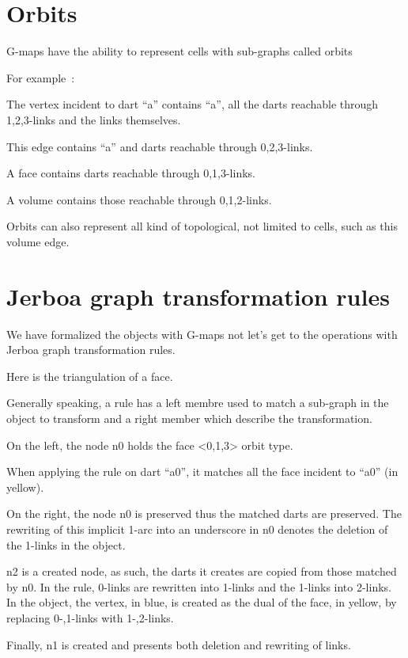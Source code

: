 \documentclass[11pt]{article}
\begin{document}
\section{Orbits}
\label{sec:org99b57a4}

G-maps have the ability to represent cells with sub-graphs called orbits

For example~:

The vertex incident to dart ``a'' contains ``a'', all the darts reachable
through 1,2,3-links and the links themselves.

This edge contains ``a'' and darts reachable through 0,2,3-links.

A face contains darts reachable through 0,1,3-links.

A volume contains those reachable through 0,1,2-links.

Orbits can also represent all kind of topological, not limited to cells, such as
this volume edge.

\section{Jerboa graph transformation rules}
\label{sec:org89fe9a5}

We have formalized the objects with G-maps not let's get to the operations with
Jerboa graph transformation rules.

Here is the triangulation of a face.

Generally speaking, a rule has a left membre used to match a sub-graph in the
object to transform and a right member which describe the transformation.

On the left, the node n0 holds the face <0,1,3> orbit type.

When applying the rule on dart ``a0'', it matches all the face incident to
``a0'' (in yellow).

On the right, the node n0 is preserved thus the matched darts are preserved. %
The rewriting of this implicit 1-arc into an underscore in n0 denotes the
deletion of the 1-links in the object. %

n2 is a created node, as such, the darts it creates are copied from those
matched by n0. %
In the rule, 0-links are rewritten into 1-links and the 1-links into 2-links. %
In the object, the vertex, in blue, is created as the dual of the face, in
yellow, by replacing 0-,1-links with 1-,2-links. %

Finally, n1 is created and presents both deletion and rewriting of links. %
\end{document}

